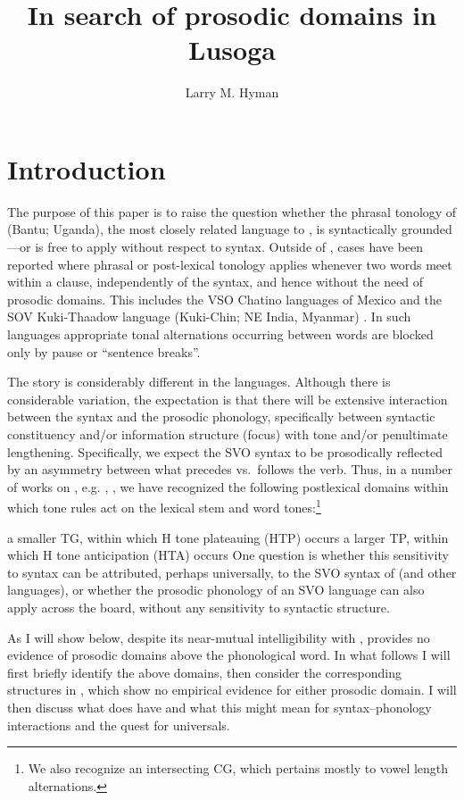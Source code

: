\documentclass[output=paper]{langsci/langscibook}
\author{Larry M. Hyman\affiliation{University of California, Berkeley}}
\title{In search of prosodic domains in Lusoga}
\begin{document}
\glsresetall

\section{Introduction}\label{sec:13.1}\largerpage

The purpose of this paper is to raise the question whether the phrasal tonology
of  (Bantu; Uganda), the most closely related language to , is
syntactically grounded—or is free to apply without respect to syntax. Outside
of , cases have been reported where phrasal or post-lexical tonology
applies whenever two words meet within a clause, independently of the syntax,
and hence without the need of prosodic domains. This
includes the VSO Chatino languages of Mexico
\parencite{Cruz2011,Campbell2014,McIntosh2015,Sullivant2015,Villard2015} and
the SOV Kuki-Thaadow language (Kuki-Chin; NE India, Myanmar) \citep{Hyman2010}.
In such languages appropriate tonal alternations occurring between words are
blocked only by pause or “sentence breaks”.

The story is considerably different in the  languages. Although there is
considerable variation, the expectation is that there will be extensive
interaction between the syntax and the prosodic phonology, specifically between
syntactic constituency and/or information structure (focus) with tone and/or
penultimate lengthening. Specifically, we expect the SVO syntax to be
prosodically reflected by an asymmetry between what precedes vs.\ follows the
verb. Thus, in a number of works on , e.g.
\citet{HymanKatambaWalusimbi1987}, \citet{HymanKatamba2010}, we have recognized
the following postlexical domains within which tone rules act on the lexical
stem and word tones:\footnote{We also recognize an intersecting \gls{CG}, which
pertains mostly to vowel length alternations.}

\ea\label{ex:key:13.1}
    \ea a smaller \gls{TG}, within which H tone plateauing (\gls{HTP}) occurs
    \ex a larger \gls{TP}, within which H tone anticipation (\gls{HTA}) occurs
    \z
\z
One question is whether this sensitivity to syntax can be attributed, perhaps
universally, to the SVO syntax of  (and other  languages), or
whether the prosodic phonology of an SVO language can also apply across the
board, without any sensitivity to syntactic structure.

As I will show below, despite its near-mutual intelligibility with ,
 provides no evidence of prosodic domains above the phonological word.
In what follows I will first briefly identify the above  domains, then
consider the corresponding structures in , which show no empirical
evidence for either prosodic domain. I will then discuss what  does have
and what this might mean for syntax--phonology interactions and the quest for
universals.
\end{document}
